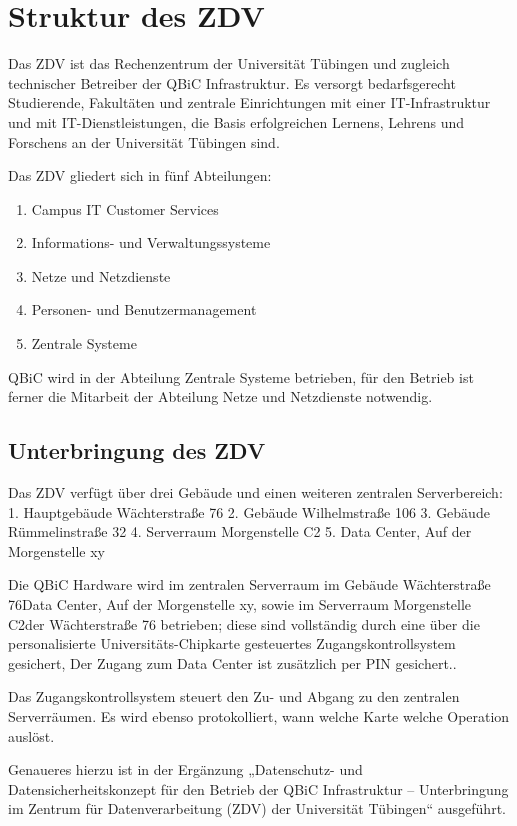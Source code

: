 \documentclass[]{scrreprt}
\begin{document}
\chapter{Struktur des ZDV}

Das ZDV ist das Rechenzentrum der Universität Tübingen und zugleich technischer Betreiber der QBiC Infrastruktur. Es versorgt bedarfsgerecht Studierende, Fakultäten und zentrale Einrichtungen mit einer IT-Infrastruktur und mit IT-Dienstleistungen, die Basis erfolgreichen Lernens, Lehrens und Forschens an der Universität Tübingen sind. 

Das ZDV gliedert sich in fünf Abteilungen:

\begin{enumerate}
	\item Campus IT Customer Services
	\item Informations- und Verwaltungssysteme
	\item Netze und Netzdienste
	\item Personen- und Benutzermanagement
	\item Zentrale Systeme
\end{enumerate}

QBiC wird in der Abteilung Zentrale Systeme betrieben, für den Betrieb ist ferner die Mitarbeit der Abteilung Netze und Netzdienste notwendig.

\section{Unterbringung des ZDV}

Das ZDV verfügt über drei Gebäude und einen weiteren zentralen Serverbereich:
1. Hauptgebäude Wächterstraße 76
2. Gebäude Wilhelmstraße 106
3. Gebäude Rümmelinstraße 32
4. Serverraum Morgenstelle C2
5. Data Center, Auf der Morgenstelle xy

Die QBiC Hardware wird im zentralen Serverraum im Gebäude Wächterstraße 76Data Center, Auf der Morgenstelle xy, sowie im Serverraum Morgenstelle C2der Wächterstraße 76 betrieben; diese sind vollständig durch eine über die personalisierte Universitäts-Chipkarte gesteuertes Zugangskontrollsystem gesichert,  Der Zugang zum Data Center ist zusätzlich per PIN gesichert..

Das Zugangskontrollsystem steuert den Zu- und Abgang zu den zentralen Serverräumen. Es wird ebenso protokolliert, wann welche Karte welche Operation auslöst.

Genaueres hierzu ist in der Ergänzung „Datenschutz- und Datensicherheitskonzept für den Betrieb der QBiC Infrastruktur – Unterbringung im Zentrum für Datenverarbeitung (ZDV) der Universität Tü­bingen“ ausgeführt.
\end{document}
